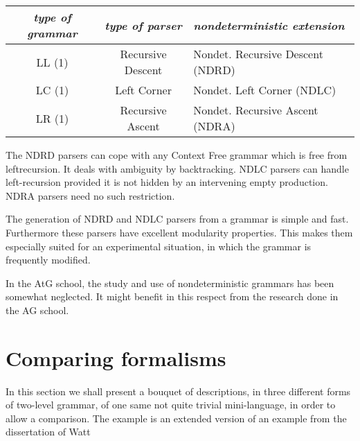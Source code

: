 \vspace{.5cm}
\noindent
\begin{tabular}{ccl}
{\em type of grammar} & {\em type of parser} & {\em nondeterministic
extension} \\ \hline
LL (1) & Recursive Descent & Nondet. Recursive Descent (NDRD)
\cite{koster:rbackup} \\
LC (1) & Left Corner & Nondet. Left Corner (NDLC)
\cite{meijer:diss} \\
LR (1) & Recursive Ascent & Nondet. Recursive Ascent (NDRA)
\end{tabular}

\vspace{.5cm}
The NDRD parsers can cope with any Context Free grammar which is
free from leftrecursion. It deals with ambiguity by backtracking.
NDLC parsers can handle left-recursion provided it is not hidden by an
intervening empty production. NDRA parsers need no such restriction.

The generation of NDRD and NDLC parsers from a grammar is simple and
fast. Furthermore these parsers have excellent modularity properties.
This makes them especially suited for an experimental situation, in which
the grammar is frequently modified.

In the AtG school, the study and use of nondeterministic grammars
has been somewhat neglected. It might benefit in this respect from
the research done in the AG school.
\section{Comparing formalisms}
In this section we shall present a bouquet of descriptions,
in three different forms of two-level grammar, of one same
not quite trivial mini-language, in order to allow a comparison.
The example is an extended version of an example from the dissertation
of Watt \cite{watt:diss}
